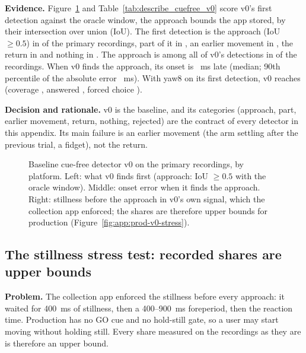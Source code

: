 \textbf{Evidence.}
Figure~\ref{fig:app:prod-v0} and Table~\ref{tab:describe_cuefree_v0} score v0's first detection against the oracle window, the approach bounds the app stored, by their intersection over union (IoU).
The first detection is the approach (IoU $\ge 0.5$) in  of the primary recordings, part of it in , an earlier movement in , the return in  and nothing in .
The approach is among all of v0's detections in  of the recordings.
When v0 finds the approach, its onset is ~ms late (median; 90th percentile of the absolute error ~ms).
With yaw8 on its first detection, v0 reaches  (coverage , answered , forced choice ).

\textbf{Decision and rationale.}
v0 is the baseline, and its categories (approach, part, earlier movement, return, nothing, rejected) are the contract of every detector in this appendix.
Its main failure is an earlier movement (the arm settling after the previous trial, a fidget), not the return.

\begin{figure}[htbp]
  \centering
  \caption{Baseline cue-free detector v0 on the primary recordings, by platform. Left: what v0 finds first (approach: IoU $\ge 0.5$ with the oracle window). Middle: onset error when it finds the approach. Right: stillness before the approach in v0's own signal, which the collection app enforced; the shares are therefore upper bounds for production (Figure~\ref{fig:app:prod-v0-stress}).}
  \label{fig:S2_16_cuefree_v0}\label{fig:app:prod-v0}
\end{figure}
\FloatBarrier

\subsection{The stillness stress test: recorded shares are upper bounds}\label{app:prod:stress}

\textbf{Problem.}
The collection app enforced the stillness before every approach: it waited for 400~ms of stillness, then a 400--900~ms foreperiod, then the reaction time.
Production has no GO cue and no hold-still gate, so a user may start moving without holding still.
Every share measured on the recordings as they are is therefore an upper bound.

